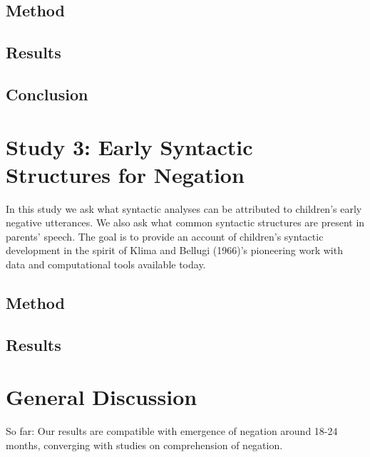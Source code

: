 \documentclass[man,floatsintext,draftall]{apa6}
\begin{document}
\hypertarget{method}{%
\subsection{Method}\label{method}}

\hypertarget{results-1}{%
\subsection{Results}\label{results-1}}

\hypertarget{conclusion}{%
\subsection{Conclusion}\label{conclusion}}

\hypertarget{study-3-early-syntactic-structures-for-negation}{%
\section{Study 3: Early Syntactic Structures for Negation}\label{study-3-early-syntactic-structures-for-negation}}

In this study we ask what syntactic analyses can be attributed to children's early negative utterances. We also ask what common syntactic structures are present in parents' speech. The goal is to provide an account of children's syntactic development in the spirit of Klima and Bellugi (1966)'s pioneering work with data and computational tools available today.

\hypertarget{method-1}{%
\subsection{Method}\label{method-1}}

\hypertarget{results-2}{%
\subsection{Results}\label{results-2}}

\hypertarget{general-discussion}{%
\section{General Discussion}\label{general-discussion}}

So far: Our results are compatible with emergence of negation around 18-24 months, converging with studies on comprehension of negation.

\newpage
\end{document}
